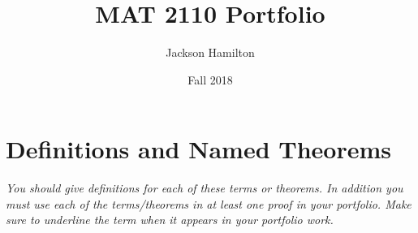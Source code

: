 \documentclass[11pt, oneside]{article}
\title{MAT 2110 Portfolio}
\author{Jackson Hamilton}
\date{Fall 2018}
\begin{document}
\newcommand{\modular}[1]{\; \mbox{(mod $#1$)}}
\thispagestyle{empty}
\maketitle
\tableofcontents
\thispagestyle{empty}



\mbox{}
\newpage
\setcounter{page}{1}



\section{Definitions and Named Theorems}
\noindent \textit{You should give definitions for each of these terms or theorems.  In addition you must use each of the terms/theorems in at least one proof in your portfolio.  Make sure to underline the term when it appears in your portfolio work. }
\end{document}

